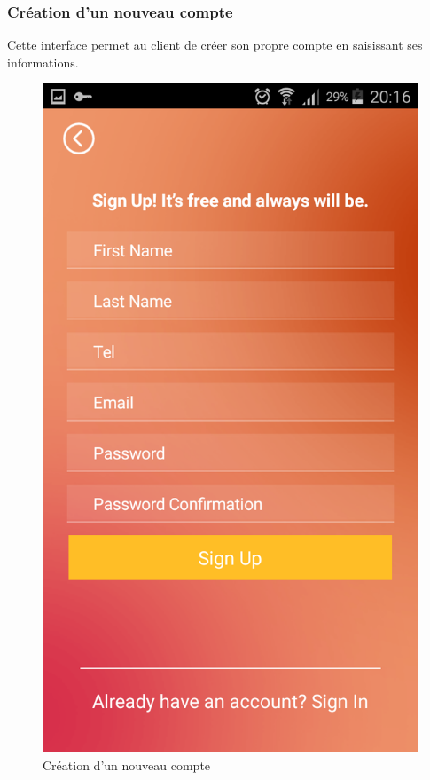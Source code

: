 \documentclass[12pt,a4paper]{report}
\begin{document}
	\subsubsection{Création d'un nouveau compte}
Cette interface permet au client de créer son propre compte en saisissant ses informations.
	\vspace{2cm}
	\begin{figure}[!hbtp]
		\centering
		\includegraphics[scale=0.2]{./graphics/Signup.png}
		\caption{Création d'un nouveau compte}
		\end{figure}
		\newpage
\end{document}
